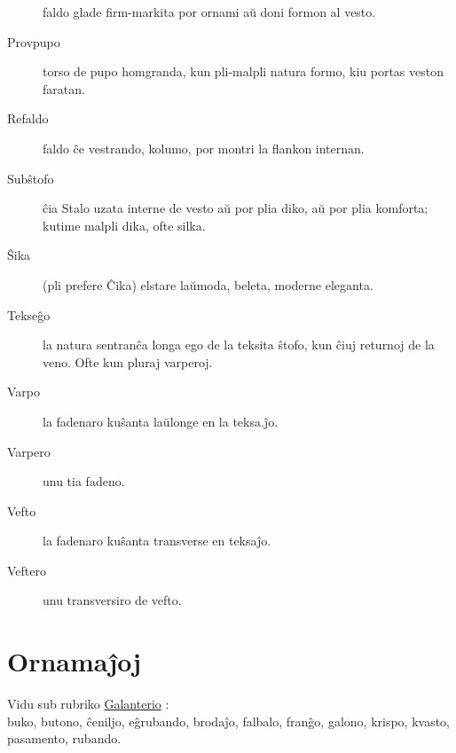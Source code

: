 \begin{description}
 faldo glade firm-markita por ornami aŭ doni formon al vesto.

\item[Provpupo]

 torso de pupo homgranda, kun pli-malpli natura formo, kiu portas veston faratan.

\item[Refaldo]

 faldo ĉe vestrando, kolumo, por montri la flankon internan.

\item[Subŝtofo]

 ĉia Stalo uzata interne de vesto aŭ por plia diko, aŭ por plia komforta; kutime malpli dika, ofte silka.

\item[\dagger\space Ŝika]

 (pli prefere \ast\space Ĉika) elstare laŭmoda, beleta, moderne eleganta.

\item[Tekseĝo]

 la natura sentranĉa longa ego de la teksita ŝtofo, kun ĉiuj returnoj de la veno. Ofte kun pluraj varperoj.

\item[Varpo]

 la fadenaro kuŝanta laŭlonge en la teksa.ĵo.

\item[Varpero]

 unu tia fadeno.

\item[Vefto]

 la fadenaro kuŝanta transverse en teksaĵo.

\item[Veftero]

 unu transversiro de vefto.
\end{description}

\section[Ornamaĵoj]{Ornamaĵoj}
\hypertarget{Ornamaĵoj}{}
\label{Ornamaĵoj}


\hspace{1.2em}Vidu sub rubriko \hyperlink{Galanterio}{Galanterio} :\\
buko, butono, ĉeniljo, eĝrubando, brodaĵo, falbalo, franĝo, galono, krispo, kvasto, pasamento, rubando.


